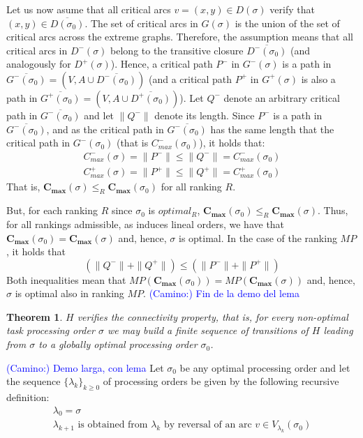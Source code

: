 \documentclass[preprint]{elsarticle}
\newcommand{\textcam}[1]{\textcolor{blue}{(Camino:) #1}}
\newtheorem{theorem}{Theorem}
\begin{document}
Let us now asume that all critical arcs $v=(x,y) \in D(\sigma)$ verify that $(x,y) \in \overline{D(\sigma_0)}$. The set of critical arcs in $G(\sigma)$ is the union of the set of critical arcs across the extreme graphs. Therefore, the assumption means that all critical arcs in $D^-(\sigma)$ belong to the transitive closure $\overline{D^-(\sigma_0)}$ (and analogously for $D^+(\sigma)$). Hence, a critical path $P^-$ in $G^-(\sigma)$ is a path in $\overline{G^-(\sigma_0)} = (V, A \cup \overline{D^-(\sigma_0)})$ (and a critical path $P^+$ in $G^+(\sigma)$ is also a path in $\overline{G^+(\sigma_0)} = (V, A \cup \overline{D^+(\sigma_0)})$). Let $Q^-$ denote an arbitrary critical path in $\overline{G^-(\sigma_0)}$ and let $\|Q^-\|$ denote its length. Since $P^-$ is a path in $\overline{G^-(\sigma_0)}$, and as the critical path in $\overline{G^-(\sigma_0)}$ has the same length that the critical path in $G^-(\sigma_0)$ (that is $C_{max}^-(\sigma_0)$), it holds that:
\begin{align*}
C_{max}^-(\sigma) = \|P^-\| \leq \|Q^-\| = C_{max}^-(\sigma_0)\\
C_{max}^+(\sigma) = \|P^+\| \leq \|Q^+\| = C_{max}^+(\sigma_0)
\end{align*}
That is, $\mathbf{C_{max}}(\sigma) \leq_R \mathbf{C_{max}}(\sigma_0)$ for all ranking $R$.

But, for each ranking $R$ since $\sigma_0$ is $optimal_R$, $\mathbf{C_{max}}(\sigma_0) \leq_R \mathbf{C_{max}}(\sigma)$. Thus, for all rankings admissible, as induces lineal orders, we have that $\mathbf{C_{max}}(\sigma_0) = \mathbf{C_{max}}(\sigma)$ and, hence, $\sigma$ is optimal. In the case of the ranking $MP$, it holds that
\begin{equation*}
(\|Q^-\| + \|Q^+\|) \leq (\|P^-\| + \|P^+\|)
\end{equation*}
Both inequalities mean that $MP(\mathbf{C_{max}}(\sigma_0)) = MP(\mathbf{C_{max}}(\sigma))$ and, hence, $\sigma$ is optimal also in ranking $MP$.
\textcam{Fin de la demo del lema}

\begin{theorem}\label{thConnectivityH2}
$H$ verifies the connectivity property, that is, for every non-optimal task processing order $\sigma$ we may build a finite sequence of transitions of $H$ leading from $\sigma$ to a globally optimal processing order $\sigma_0$.
\end{theorem}
\textcam{Demo larga, con lema}
Let $\sigma_0$ be any optimal processing order and let the sequence $\{\lambda_k\}_{k \geq 0}$ of processing orders be given by the following recursive definition:
\begin{gather*}
\lambda_0 = \sigma\\
\lambda_{k+1} \text{ is obtained from } \lambda_k \text{ by reversal of an arc } v \in V_{\lambda_k}(\sigma_0)
\end{gather*}
\end{document}
